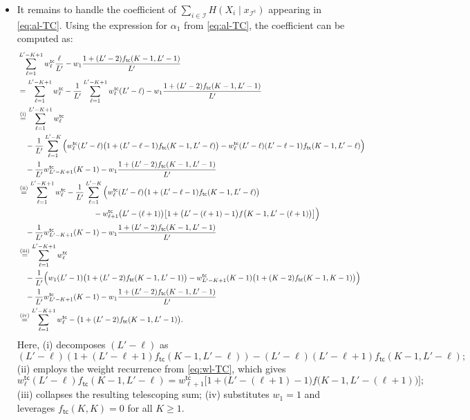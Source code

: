 \documentclass[english]{article}
\newcommand{\cI}{\mathcal{I}}
\newcommand{\tc}{\mathsf{tc}}
\begin{document}
\begin{itemize}
\item It remains to handle the coefficient of $ \sum_{i \in \cI} H(X_i \mid x_{\cI^\mathsf{c}}) $ appearing in \eqref{eq:al-TC}. Using the expression for $\alpha_1$ from \eqref{eq:al-TC}, the coefficient can be computed as:
\begin{align} 
    &\sum_{\ell = 1}^{L'-K+1} w^\tc_{\ell} \frac{\ell}{L'} - w_1\frac{1+(L'-2)f_\tc(K-1, L'-1)}{L'} \notag \\
    &= \sum_{\ell = 1}^{L'-K+1} w^\tc_{\ell} - \frac{1}{L'} \sum_{\ell = 1}^{L'-K+1} w^\tc_{\ell} (L'-\ell) - w_1\frac{1+(L'-2)f_\tc(K-1, L'-1)}{L'} \notag \\
    &\stackrel{\text{(i)}}{=} \sum_{\ell = 1}^{L'-K+1} w^\tc_{\ell} \notag \\
    &\quad - \frac{1}{L'} \sum_{\ell = 1}^{L'-K} \Big( w^\tc_{\ell} (L'-\ell)\big(1 + (L'-\ell-1)f_\tc(K-1, L'-\ell)\big) - w^\tc_{\ell} (L'-\ell)(L'-\ell-1)f_\tc(K-1, L'-\ell) \Big) \notag \\
    &\quad -\frac{1}{L'}w^\tc_{L'-K+1} (K-1) - w_1\frac{1+(L'-2)f_\tc(K-1, L'-1)}{L'} \notag \\
    &\stackrel{\text{(ii)}}{=} \sum_{\ell = 1}^{L'-K+1} w^\tc_{\ell} - \frac{1}{L'} \sum_{\ell = 1}^{L'-K} \Big( w^\tc_{\ell} (L'-\ell)\big(1 + (L'-\ell-1)f_\tc(K-1, L'-\ell)\big) \notag \\
    &\qquad \qquad \qquad \qquad \qquad - w^\tc_{\ell + 1} \big(L'-(\ell + 1)\big)\big[1 + \big(L'-(\ell + 1)-1\big)f\big(K-1, L'-(\ell + 1)\big)\big] \Big) \notag \\
    &\quad -\frac{1}{L'}w^\tc_{L'-K+1} (K-1) - w_1\frac{1+(L'-2)f_\tc(K-1, L'-1)}{L'} \notag \\
    &\stackrel{\text{(iii)}}{=} \sum_{\ell = 1}^{L'-K+1} w^\tc_{\ell} \notag \\
    &\quad - \frac{1}{L'} \Big( w_1 (L'-1)\big(1 + (L'-2)f_\tc(K-1, L'-1)\big) - w^\tc_{L'-K+1} (K-1)\big(1 + (K-2)f_\tc(K-1, K-1)\big) \Big) \notag \\
    &\quad -\frac{1}{L'}w^\tc_{L'-K+1} (K-1) - w_1\frac{1+(L'-2)f_\tc(K-1, L'-1)}{L'} \notag \\
    &\stackrel{\text{(iv)}}{=} \sum_{\ell = 1}^{L'-K+1} w^\tc_{\ell} - \big(1 + (L'-2)f_\tc(K-1, L'-1)\big). \label{eq:coeff-TC-single}
\end{align}
Here, (i) decomposes $ (L'-\ell) $ as \[
 (L'-\ell)(1 + (L'-\ell+1)f_\tc(K-1, L'-\ell)) - (L'-\ell)(L'-\ell+1)f_\tc(K-1, L'-\ell); \]
(ii) employs the weight recurrence from \eqref{eq:wl-TC}, which gives
\[
    w^\tc_{\ell} (L'-\ell)f_\tc(K-1, L'-\ell) = w^\tc_{\ell + 1} \big[1 + \big(L'-(\ell + 1)-1\big)f\big(K-1, L'-(\ell + 1)\big)\big];
\] 
(iii) collapses the resulting telescoping sum; (iv) substitutes $ w_1 = 1 $ and leverages $ f_\tc(K,K) = 0 $ for all $ K \geq 1 $.

\end{itemize}
\end{document}
